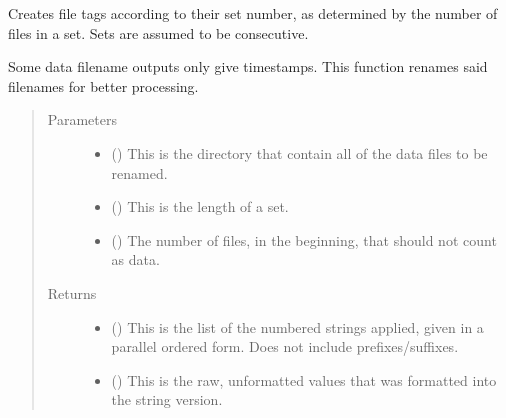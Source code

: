 \documentclass[letterpaper,10pt,english]{sphinxmanual}
\begin{document}

\begin{fulllineitems}
\label{\detokenize{docstrings/ifa_smeargle.reformat.renaming:ifa_smeargle.reformat.renaming.rename_set}}
Creates file tags according to their set number, as
determined by the number of files in a set. Sets are assumed
to be consecutive.

Some data filename outputs only give timestamps. This function
renames said filenames for better processing.
\begin{quote}\begin{description}
\item[{Parameters}] \leavevmode\begin{itemize}
\item {} 
 () \textendash{} This is the directory that contain all of the data files
to be renamed.

\item {} 
 () \textendash{} This is the length of a set.

\item {} 
 (\sphinxstyleliteralemphasis{\sphinxupquote{ (}}\sphinxstyleliteralemphasis{\sphinxupquote{)}}) \textendash{} The number of files, in the beginning, that should not
count as data.

\end{itemize}

\item[{Returns}] \leavevmode
\begin{itemize}
\item {} 
 () \textendash{} This is the list of the numbered strings applied, given in
a parallel ordered form. Does not include prefixes/suffixes.

\item {} 
 () \textendash{} This is the raw, unformatted values that was formatted
into the string version.

\end{itemize}


\end{description}\end{quote}

\end{fulllineitems}
\end{document}
